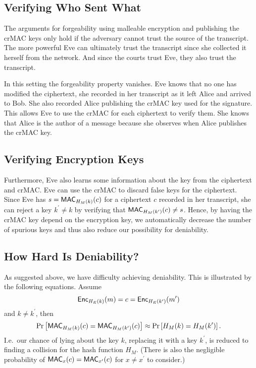 \subsection{Verifying Who Sent What}

The arguments for forgeability using malleable encryption and publishing the 
\ac{crMAC} keys only hold if the adversary cannot trust the source of the 
transcript.
The more powerful Eve can ultimately trust the transcript since she collected 
it herself from the network.
And since the courts trust Eve, they also trust the transcript.

In this setting the forgeability property vanishes.
Eve knows that no one has modified the ciphertext, she recorded in her 
transcript as it left Alice and arrived to Bob.
She also recorded Alice publishing the \ac{crMAC} key used for the signature.
This allows Eve to use the \ac{crMAC} for each ciphertext to verify them.
She knows that Alice is the author of a message because she observes when Alice 
publishes the \ac{crMAC} key.

\subsection{Verifying Encryption Keys}

Furthermore, Eve also learns some information about the key from the ciphertext 
and \ac{crMAC}.
Eve can use the \ac{crMAC} to discard false keys for the ciphertext.
Since Eve has \(s = \operatorname{\mathsf{MAC}}_{H_M( k )}( c )\) for a ciphertext \(c\) recorded in 
her transcript, she can reject a key \(k^\prime\neq k\) by verifying that
\(\operatorname{\mathsf{MAC}}_{H_M( k^\prime )}( c ) \neq s\).
Hence, by having the \ac{crMAC} key depend on the encryption key, we 
automatically decrease the number of spurious keys and thus also reduce our 
possibility for deniability.

\subsection{How Hard Is Deniability?}
\label{sec:HardnessOfDeniability}

As suggested above, we have difficulty achieving deniability.
This is illustrated by the following equations.
Assume
\begin{equation*}
  \operatorname{\mathsf{Enc}}_{H_E(k)}( m ) = c = \operatorname{\mathsf{Enc}}_{H_E(k^\prime)}( m^\prime )
\end{equation*}
and \(k\neq k^\prime\), then
\begin{equation*}
  \Pr\left[
    \operatorname{\mathsf{MAC}}_{H_M(k)}( c ) = \operatorname{\mathsf{MAC}}_{H_M(k^\prime)}( c )
  \right]
  \approx
  \Pr\left[ H_M(k) = H_M(k^\prime) \right].
\end{equation*}
I.e.~our chance of lying about the key \(k\), replacing it with a key 
\(k^\prime\), is reduced to finding a collision for the hash function \(H_M\).
(There is also the negligible probability of \(\operatorname{\mathsf{MAC}}_x(c) = \operatorname{\mathsf{MAC}}_{x^\prime}(c)\) 
for \(x\neq x^\prime\) to consider.)

